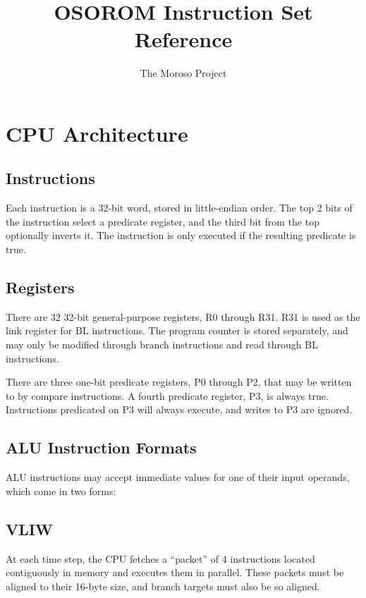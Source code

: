 \documentclass[11pt,openany]{report}
\title{OSOROM Instruction Set Reference}
\author{The Moroso Project}
\begin{document}
\maketitle
\tableofcontents

\chapter{CPU Architecture}

\section{Instructions}
Each instruction is a 32-bit word, stored in little-endian order. The top 2 bits of the instruction select a predicate register, and the third bit from the top optionally inverts it. The instruction is only executed if the resulting predicate is true.



\section{Registers}
There are 32 32-bit general-purpose registers, R0 through R31. R31 is used as the link register for BL instructions. The program counter is stored separately, and may only be modified through branch instructions and read through BL instructions. 

There are three one-bit predicate registers, P0 through P2, that may be written to by compare instructions. A fourth predicate register, P3, is always true. Instructions predicated on P3 will always execute, and writes to P3 are ignored.

\section{ALU Instruction Formats}

ALU instructions may accept immediate values for one of their input operands, which come in two forms:

\section{VLIW}
At each time step, the CPU fetches a ``packet'' of 4 instructions located contiguously in memory and executes them in parallel. These packets must be aligned to their 16-byte size, and branch targets must also be so aligned. 
\end{document}
